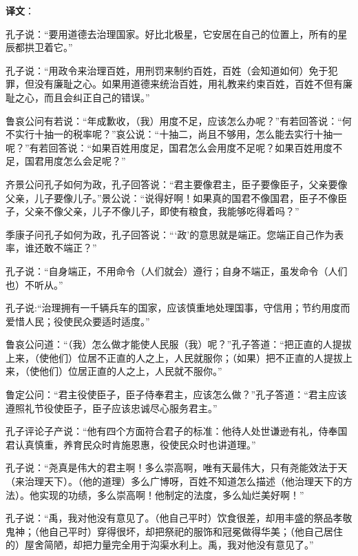 \documentclass[12pt,UTF-8,openany,a4]{ctexbook}
\begin{document}
\newpage

\begin{Large}
   \noindent \textbf{译文}：
\end{Large}

\vspace{1em}

\begin{large}\yiwen
    
    孔子说：“要用道德去治理国家。好比北极星，它安居在自己的位置上，所有的星辰都拱卫着它。”
    
    孔子说：“用政令来治理百姓，用刑罚来制约百姓，百姓（会知道如何）免于犯罪，但没有廉耻之心。如果用道德来统治百姓，用礼教来约束百姓，百姓不但有廉耻之心，而且会纠正自己的错误。”
    
    鲁哀公问有若说：“年成歉收，（我）用度不足，应该怎么办呢？”有若回答说：“何不实行十抽一的税率呢？”哀公说：“十抽二，尚且不够用，怎么能去实行十抽一呢？”有若回答说：“如果百姓用度足，国君怎么会用度不足呢？如果百姓用度不足，国君用度怎么会足呢？”
    
    齐景公问孔子如何为政，孔子回答说：“君主要像君主，臣子要像臣子，父亲要像父亲，儿子要像儿子。”景公说：“说得好啊！如果真的国君不像国君，臣子不像臣子，父亲不像父亲，儿子不像儿子，即使有粮食，我能够吃得着吗？”
    
    季康子问孔子如何为政，孔子回答说：“‘政’的意思就是端正。您端正自己作为表率，谁还敢不端正？”
    
    孔子说：“自身端正，不用命令（人们就会）遵行；自身不端正，虽发命令（人们也）不听从。”
    
    孔子说:“治理拥有一千辆兵车的国家，应该慎重地处理国事，守信用；节约用度而爱惜人民；役使民众要适时适度。”
    
    鲁哀公问道：“（我）怎么做才能使人民服（我）呢？”孔子答道：“把正直的人提拔上来，（使他们）位居不正直的人之上，人民就服你；（如果）把不正直的人提拔上来，（使他们）位居正直的人之上，人民就不服你。”
    
    鲁定公问：“君主役使臣子，臣子侍奉君主，应该怎么做？”孔子答道：“君主应该遵照礼节役使臣子，臣子应该忠诚尽心服务君主。”
    
    孔子评论子产说：“他有四个方面符合君子的标准：他待人处世谦逊有礼，侍奉国君认真慎重，养育民众时肯施恩惠，役使民众时也讲道理。”
    
    孔子说：“尧真是伟大的君主啊！多么崇高啊，唯有天最伟大，只有尧能效法于天（来治理天下）。（他的道理）多么广博呀，百姓不知道怎么描述（他治理天下的方法）。他实现的功绩，多么崇高啊！他制定的法度，多么灿烂美好啊！”
    
    孔子说：“禹，我对他没有意见了。（他自己平时）饮食很差，却用丰盛的祭品孝敬鬼神；（他自己平时）穿得很坏，却把祭祀的服饰和冠冕做得华美；（他自己居住的）屋舍简陋，却把力量完全用于沟渠水利上。禹，我对他没有意见了。”
    

\end{large}
\end{document}
